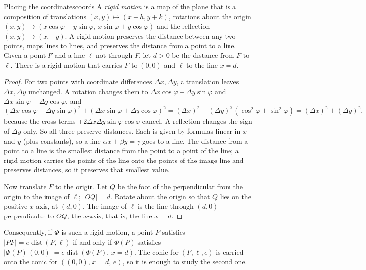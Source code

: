 \documentclass[11pt]{article}
\begin{document}
\begin{thm}{Placing the coordinates}{coords}
A \emph{rigid motion} is a map of the plane that is a composition of translations $(x,y)\mapsto(x+h,y+k)$, rotations about the origin $(x,y)\mapsto(x\cos\varphi-y\sin\varphi,\ x\sin\varphi+y\cos\varphi)$ and the reflection $(x,y)\mapsto(x,-y)$. A rigid motion preserves the distance between any two points, maps lines to lines, and preserves the distance from a point to a line. Given a point $F$ and a line $\ell$ not through $F$, let $d>0$ be the distance from $F$ to $\ell$. There is a rigid motion that carries $F$ to $(0,0)$ and $\ell$ to the line $x=d$.
\end{thm}
\begin{proof}
For two points with coordinate differences $\Delta x,\Delta y$, a translation leaves $\Delta x,\Delta y$ unchanged. A rotation changes them to $\Delta x\cos\varphi-\Delta y\sin\varphi$ and $\Delta x\sin\varphi+\Delta y\cos\varphi$, and
\[
(\Delta x\cos\varphi-\Delta y\sin\varphi)^2+(\Delta x\sin\varphi+\Delta y\cos\varphi)^2=(\Delta x)^2+(\Delta y)^2\,(\cos^2\varphi+\sin^2\varphi)=(\Delta x)^2+(\Delta y)^2,
\]
because the cross terms $\mp2\Delta x\Delta y\sin\varphi\cos\varphi$ cancel. A reflection changes the sign of $\Delta y$ only. So all three preserve distances. Each is given by formulas linear in $x$ and $y$ (plus constants), so a line $\alpha x+\beta y=\gamma$ goes to a line. The distance from a point to a line is the smallest distance from the point to a point of the line; a rigid motion carries the points of the line onto the points of the image line and preserves distances, so it preserves that smallest value.

Now translate $F$ to the origin. Let $Q$ be the foot of the perpendicular from the origin to the image of $\ell$; $\lvert OQ\rvert=d$. Rotate about the origin so that $Q$ lies on the positive $x$-axis, at $(d,0)$. The image of $\ell$ is the line through $(d,0)$ perpendicular to $OQ$, the $x$-axis, that is, the line $x=d$.
\end{proof}

Consequently, if $\Phi$ is such a rigid motion, a point $P$ satisfies $\lvert PF\rvert=e\operatorname{dist}(P,\ell)$ if and only if $\Phi(P)$ satisfies $\lvert\Phi(P)\,(0,0)\rvert=e\operatorname{dist}(\Phi(P),\,x=d)$. The conic for $(F,\ell,e)$ is carried onto the conic for $((0,0),\,x=d,\,e)$, so it is enough to study the second one.
\end{document}
